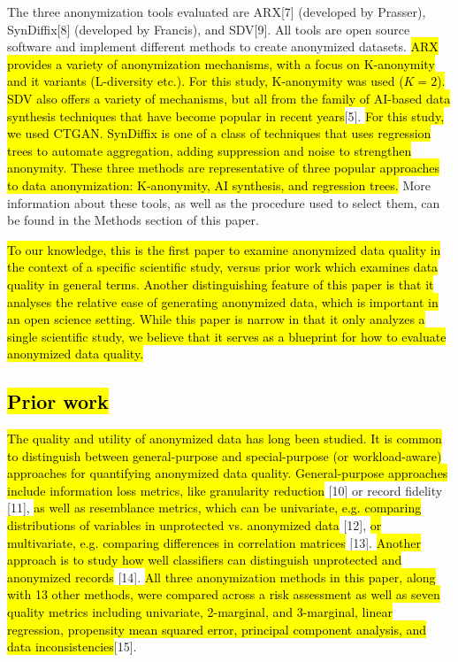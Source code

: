 \documentclass[10pt]{article}
\newcommand{\mycite}[1]{[#1]}
\begin{document}
The three anonymization tools evaluated are ARX\mycite{7} (developed by Prasser), SynDiffix\mycite{8} (developed by Francis), and SDV\mycite{9}. All tools are open source software and implement different methods to create anonymized datasets. \hl{
ARX provides a variety of anonymization mechanisms, with a focus on K-anonymity and it variants (L-diversity etc.). For this study, K-anonymity was used ($K=2$). SDV also offers a variety of mechanisms, but all from the family of AI-based data synthesis techniques that have become popular in recent years}\mycite{5}. \hl{For this study, we used CTGAN. SynDiffix is one of a class of techniques that uses regression trees to automate aggregation, adding suppression and noise to strengthen anonymity. These three methods are representative of three popular approaches to data anonymization: K-anonymity, AI synthesis, and regression trees.} More information about these tools, as well as the procedure used to select them, can be found in the Methods section of this paper.

\hl{To our knowledge, this is the first paper to examine anonymized data quality in the context of a specific scientific study, versus prior work which examines data quality in general terms. Another distinguishing feature of this paper is that it analyses the relative ease of generating anonymized data, which is important in an open science setting. While this paper is narrow in that it only analyzes a single scientific study, we believe that it serves as a blueprint for how to evaluate anonymized data quality.}

\subsection*{\hl{Prior work}}

\hl{The quality and utility of anonymized data has long been studied. It is common to distinguish between general-purpose and special-purpose (or workload-aware) approaches for quantifying anonymized data quality. General-purpose approaches include information loss metrics, like granularity reduction} \mycite{10} or record fidelity \mycite{11}, \hl{as well as resemblance metrics, which can be univariate, e.g. comparing distributions of variables in unprotected vs. anonymized data} \mycite{12}, \hl{or multivariate, e.g. comparing differences in correlation matrices} \mycite{13}. \hl{Another approach is to study how well classifiers can distinguish unprotected and anonymized records} \mycite{14}. \hl{All three anonymization methods in this paper, along with 13 other methods, were compared across a risk assessment as well as seven quality metrics including univariate, 2-marginal, and 3-marginal, linear regression, propensity mean squared error, principal component analysis, and data inconsistencies}\mycite{15}.
\end{document}
